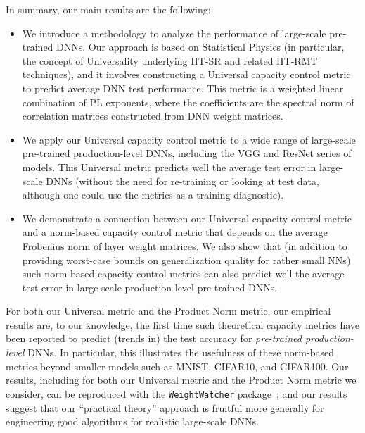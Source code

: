 In summary, our main results are the following:
\begin{itemize}
\item
We introduce a methodology to analyze the performance of large-scale pre-trained DNNs.
Our approach is based on Statistical Physics (in particular, the concept of Universality underlying HT-SR and related HT-RMT techniques), and it involves constructing a Universal capacity control metric to predict average DNN test performance.
This metric is a weighted linear combination of PL exponents, where the coefficients are the spectral norm of correlation matrices constructed from DNN weight matrices.
\item
We apply our Universal capacity control metric to a wide range of large-scale pre-trained production-level DNNs, including the VGG and ResNet series of models.
This Universal metric predicts well the average test error in large-scale DNNs (without the need for re-training or looking at test data, although one could use the metrics as a training diagnostic).
\item
We demonstrate a connection between our Universal capacity control metric and a norm-based capacity control metric that depends on the average Frobenius norm of layer weight matrices.
We also show that (in addition to providing worst-case bounds on generalization quality for rather small NNs) such norm-based capacity control metrics can also predict well the average test error in large-scale production-level pre-trained DNNs.
\end{itemize}
For both our Universal metric and the Product Norm metric, our empirical results are, to our knowledge, the first time such theoretical capacity metrics have been reported to predict (trends in) the test accuracy for \emph{pre-trained production-level} DNNs.
In particular, this illustrates the usefulness of these norm-based metrics beyond smaller models such as MNIST, CIFAR10, and CIFAR100. 
Our 
results, including for both our Universal metric and the Product Norm metric we consider, can be reproduced with the \texttt{WeightWatcher} package~\cite{weightwatcher_pagkage}; and our
results suggest that our ``practical theory'' approach is fruitful more generally for engineering good algorithms for realistic large-scale DNNs.


